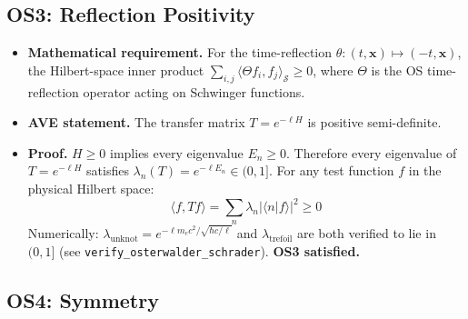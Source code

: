 \subsection{OS3: Reflection Positivity}

\begin{itemize}
    \item \textbf{Mathematical requirement.}  For the time-reflection
          $\theta\colon (t,\mathbf{x}) \mapsto (-t,\mathbf{x})$,
          the Hilbert-space inner product
          $\sum_{i,j} \langle \Theta f_i, f_j \rangle_{\mathcal{S}} \geq 0$,
          where $\Theta$ is the OS time-reflection operator acting on
          Schwinger functions.
    \item \textbf{AVE statement.}  The transfer matrix $T = e^{-\ell H}$ is
          positive semi-definite.
    \item \textbf{Proof.}  $H \geq 0$ implies every eigenvalue $E_n \geq 0$.
          Therefore every eigenvalue of $T = e^{-\ell H}$ satisfies
          $\lambda_n(T) = e^{-\ell E_n} \in (0, 1]$.  For any test function
          $f$ in the physical Hilbert space:
          \begin{equation}
              \langle f, Tf \rangle = \sum_n \lambda_n |\langle n \lvert f \rangle|^2 \geq 0
          \end{equation}
          Numerically: $\lambda_\text{unknot} = e^{-\ell m_e c^2/\sqrt{\hbar c/\ell}}$
          and $\lambda_\text{trefoil}$ are both verified to lie in $(0,1]$
          (see \texttt{verify\_osterwalder\_schrader}).  \textbf{OS3 satisfied.}
\end{itemize}

\subsection{OS4: Symmetry}


